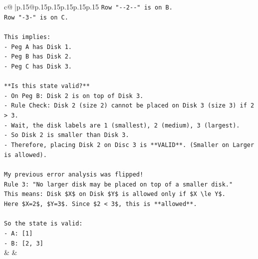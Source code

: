\documentclass{article}
\begin{document}
{\begin{supertabular}{c@{$\;$}|p{.15\linewidth}@{}p{.15\linewidth}p{.15\linewidth}p{.15\linewidth}p{.15\linewidth}p{.15\linewidth}}
{{{\texttt{Row "{-}{-}2{-}{-}" is on B.} \\
\texttt{Row "{-}3{-}" is on C.} \\
\\ 
\texttt{This implies:} \\
\texttt{{-} Peg A has Disk 1.} \\
\texttt{{-} Peg B has Disk 2.} \\
\texttt{{-} Peg C has Disk 3.} \\
\\ 
\texttt{**Is this state valid?**} \\
\texttt{{-} On Peg B: Disk 2 is on top of Disk 3.} \\
\texttt{{-} Rule Check: Disk 2 (size 2) cannot be placed on Disk 3 (size 3) if 2 > 3.} \\
\texttt{{-} Wait, the disk labels are 1 (smallest), 2 (medium), 3 (largest).} \\
\texttt{{-} So Disk 2 is smaller than Disk 3.} \\
\texttt{{-} Therefore, placing Disk 2 on Disc 3 is **VALID**. (Smaller on Larger is allowed).} \\
\\ 
\texttt{My previous error analysis was flipped!} \\
\texttt{Rule 3: "No larger disk may be placed on top of a smaller disk."} \\
\texttt{This means: Disk \$X\$ on Disk \$Y\$ is allowed only if \$X \textbackslash{}le Y\$.} \\
\texttt{Here \$X=2\$, \$Y=3\$. Since \$2 < 3\$, this is **allowed**.} \\
\\ 
\texttt{So the state is valid:} \\
\texttt{{-} A: {[}1{]}} \\
\texttt{{-} B: {[}2, 3{]}} \\
            }
        }
    }
    & & \\ \\


\end{supertabular}}
\end{document}

